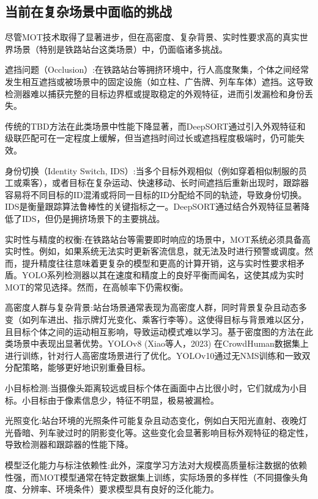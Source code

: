\subsection{当前在复杂场景中面临的挑战}

尽管MOT技术取得了显著进步，但在高密度、复杂背景、实时性要求高的真实世界场景（特别是铁路站台这类场景）中，仍面临诸多挑战\cite{59_wang_deep_2024}。

遮挡问题（Occlusion）:在铁路站台等拥挤环境中，行人高度聚集，个体之间经常发生相互遮挡或被场景中的固定设施（如立柱、广告牌、列车车体）遮挡。这导致检测器难以捕获完整的目标边界框或提取稳定的外观特征，进而引发漏检和身份丢失\cite{91}。

传统的TBD方法在此类场景中性能下降显著，而DeepSORT通过引入外观特征和级联匹配可在一定程度上缓解，但当遮挡时间过长或遮挡程度极端时，仍可能失效\cite{134}。

身份切换（Identity Switch, IDS）:当多个目标外观相似（例如穿着相似制服的员工或乘客），或者目标在复杂运动、快速移动、长时间遮挡后重新出现时，跟踪器容易将不同目标的ID混淆或将同一目标的ID分配给不同的轨迹，导致身份切换\cite{87}。IDS是衡量跟踪算法鲁棒性的关键指标之一。DeepSORT通过结合外观特征显著降低了IDS，但仍是拥挤场景下的主要挑战\cite{134}。

实时性与精度的权衡:在铁路站台等需要即时响应的场景中，MOT系统必须具备高实时性。例如，如果系统无法实时更新客流信息，就无法及时进行预警或调度。然而，提升精度往往意味着更复杂的模型和更高的计算开销，这与实时性要求相矛盾\cite{203}。YOLO系列检测器以其在速度和精度上的良好平衡而闻名，这使其成为实时MOT的常见选择。然而，在高帧率下仍需权衡。

高密度人群与复杂背景:站台场景通常表现为高密度人群，同时背景复杂且动态多变（如列车进出、指示牌灯光变化、乘客行李等）。这使得目标与背景难以区分，且目标个体之间的运动相互影响，导致运动模式难以学习\cite{86}。基于密度图的方法在此类场景中表现出显著优势。YOLOv8 (Xiao等人，2023) 在CrowdHuman数据集上进行训练，针对行人高密度场景进行了优化。YOLOv10通过无NMS训练和一致双分配策略，能够更好地识别重叠目标。

小目标检测:当摄像头距离较远或目标个体在画面中占比很小时，它们就成为小目标。小目标由于像素信息少，特征不明显，极易被漏检\cite{28_kaur_comprehensive_2023}。

光照变化:站台环境的光照条件可能复杂且动态变化，例如白天阳光直射、夜晚灯光昏暗、列车驶过时的阴影变化等。这些变化会显著影响目标外观特征的稳定性，导致检测器和跟踪器的性能下降\cite{169}。

模型泛化能力与标注依赖性:此外，深度学习方法对大规模高质量标注数据的依赖性强，而MOT模型通常在特定数据集上训练，实际场景的多样性（不同摄像头角度、分辨率、环境条件）要求模型具有良好的泛化能力\cite{02_noauthor_review_nodate}。


